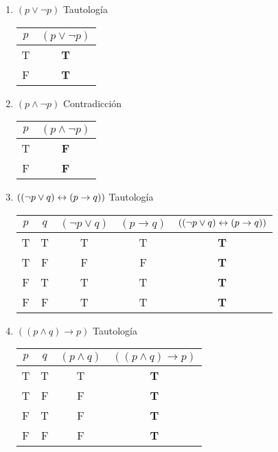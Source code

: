 \begin{enumerate}[label=\alph*)]
    \item $(p \lor \neg p)$ Tautología

          \begin{tabular}{|c|c|}
              \hline
              $p$ & $(p \lor \neg p)$ \\
              \hline
              T   & \textbf{T}        \\
              F   & \textbf{T}        \\
              \hline
          \end{tabular}

    \item $(p \land \neg p)$ Contradicción

          \begin{tabular}{|c|c|}
              \hline
              $p$ & $(p \land \neg p)$ \\
              \hline
              T   & \textbf{F}         \\
              F   & \textbf{F}         \\
              \hline
          \end{tabular}

    \item $((\neg p \lor q) \leftrightarrow (p \to q))$ Tautología

          \begin{tabular}{|c|c|c|c|c|}
              \hline
              $p$ & $q$ & $(\neg p \lor q)$ & $(p \to q)$ & $((\neg p \lor q) \leftrightarrow (p \to q))$ \\
              \hline
              T   & T   & T                 & T           & \textbf{T}                         \\
              T   & F   & F                 & F           & \textbf{T}                         \\
              F   & T   & T                 & T           & \textbf{T}                         \\
              F   & F   & T                 & T           & \textbf{T}                         \\
              \hline
          \end{tabular}

    \item $((p \land q) \to p)$ Tautología

          \begin{tabular}{|c|c|c|c|}
              \hline
              $p$ & $q$ & $(p \land q)$ & $((p \land q) \to p)$ \\
              \hline
              T   & T   & T             & \textbf{T}            \\
              T   & F   & F             & \textbf{T}            \\
              F   & T   & F             & \textbf{T}            \\
              F   & F   & F             & \textbf{T}            \\
              \hline
          \end{tabular}


\end{enumerate}
